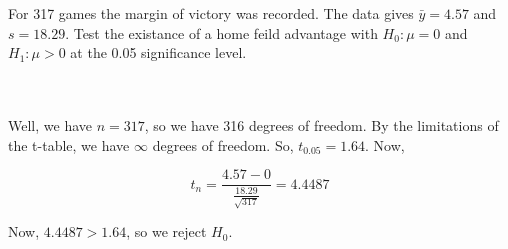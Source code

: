 For 317 games the margin of victory was recorded. The data gives $\bar{y}=4.57$ and $s=18.29$. Test the
existance of a home feild advantage with $H_0:\mu=0$ and $H_1:\mu>0$ at the 0.05 significance level.\\\\

\begin{solution}\renewcommand{\qedsymbol}{}\ \\
    Well, we have $n=317$, so we have 316 degrees of freedom. By the limitations of the t-table, we have
    $\infty$ degrees of freedom. So, $t_{0.05}=1.64$. Now,
    
    $$t_n=\frac{4.57-0}{\frac{18.29}{\sqrt{317}}}=4.4487$$
    
    Now, $4.4487>1.64$, so we reject $H_0$.

\end{solution}